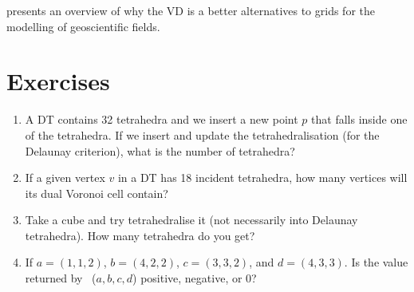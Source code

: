 \citet{Ledoux08} presents an overview of why the VD is a better alternatives to grids for the modelling of geoscientific fields.



%
\section{Exercises}

\begin{enumerate}
  \item A DT contains 32 tetrahedra and we insert a new point $p$ that falls inside one of the tetrahedra. If we insert and update the tetrahedralisation (for the Delaunay criterion), what is the number of tetrahedra?
  \item If a given vertex $v$ in a DT has 18 incident tetrahedra, how many vertices will its dual Voronoi cell contain?
  \item Take a cube and try tetrahedralise it (not necessarily into Delaunay tetrahedra). How many tetrahedra do you get?
  \item If $a = (1, 1, 2)$, $b = (4, 2, 2)$, $c = (3, 3, 2)$, and $d = (4, 3, 3)$. Is the value returned by \Orient~($a,b,c,d$) positive, negative, or 0?  
\end{enumerate}
